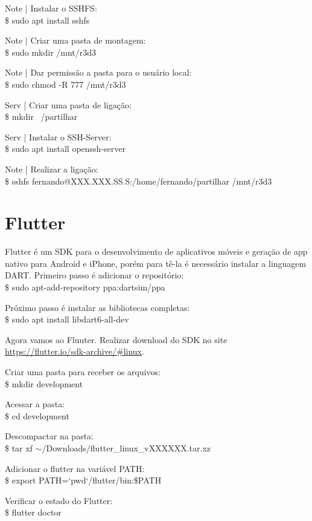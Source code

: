 \documentclass[a4paper,11pt]{article}
\begin{document}
Note | Instalar o SSHFS: \\
{\ttfamily\$ sudo apt install sshfs}

Note | Criar uma pasta de montagem: \\
{\ttfamily\$ sudo mkdir /mnt/r3d3}

Note | Dar permissão a pasta para o usuário local: \\
{\ttfamily\$ sudo chmod -R 777 /mnt/r3d3}

Serv | Criar uma pasta de ligação: \\
{\ttfamily\$ mkdir ~/partilhar}

Serv | Instalar o SSH-Server: \\
{\ttfamily\$ sudo apt install openssh-server}

Note | Realizar a ligação: \\
{\ttfamily\$ sshfs fernando@XXX.XXX.SS.S:/home/fernando/partilhar /mnt/r3d3}

\section{Flutter}
Flutter é um SDK para o desenvolvimento de aplicativos móveis e geração de app nativo para Android e iPhone, porém para tê-la é necessário instalar a linguagem DART. Primeiro passo é adicionar o repositório: \\
{\ttfamily\$ sudo apt-add-repository ppa:dartsim/ppa}

Próximo passo é instalar as bibliotecas completas: \\
{\ttfamily\$ sudo apt install libdart6-all-dev}

Agora vamos ao Fluuter. Realizar download do SDK no site \url{https://flutter.io/sdk-archive/#linux}.

Criar uma pasta para receber os arquivos: \\
{\ttfamily\$ mkdir development}

Acessar a pasta: \\
{\ttfamily\$ cd development}

Descompactar na pasta: \\
{\ttfamily\$ tar xf $\sim$/Downloads/flutter\_linux\_vXXXXXX.tar.xz}

Adicionar o flutter na variável PATH: \\
{\ttfamily\$ export PATH=`pwd`/flutter/bin:\$PATH}

Verificar o estado do Flutter: \\
{\ttfamily\$ flutter doctor}
\end{document}
